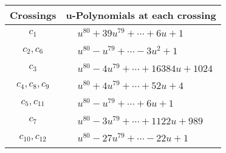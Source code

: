 \documentclass[1p]{elsarticle_modified}
\theoremstyle{definition}
\begin{document}
\begin{tabular}{m{50pt}|m{274pt}}
Crossings & \hspace{64pt}u-Polynomials at each crossing \\
\hline $$\begin{aligned}c_{1}\end{aligned}$$&$\begin{aligned}
&u^{80}+39 u^{79}+\cdots+6 u+1
\end{aligned}$\\
\hline $$\begin{aligned}c_{2},c_{6}\end{aligned}$$&$\begin{aligned}
&u^{80}- u^{79}+\cdots-3 u^2+1
\end{aligned}$\\
\hline $$\begin{aligned}c_{3}\end{aligned}$$&$\begin{aligned}
&u^{80}-4 u^{79}+\cdots+16384 u+1024
\end{aligned}$\\
\hline $$\begin{aligned}c_{4},c_{8},c_{9}\end{aligned}$$&$\begin{aligned}
&u^{80}+4 u^{79}+\cdots+52 u+4
\end{aligned}$\\
\hline $$\begin{aligned}c_{5},c_{11}\end{aligned}$$&$\begin{aligned}
&u^{80}- u^{79}+\cdots+6 u+1
\end{aligned}$\\
\hline $$\begin{aligned}c_{7}\end{aligned}$$&$\begin{aligned}
&u^{80}-3 u^{79}+\cdots+1122 u+989
\end{aligned}$\\
\hline $$\begin{aligned}c_{10},c_{12}\end{aligned}$$&$\begin{aligned}
&u^{80}-27 u^{79}+\cdots-22 u+1
\end{aligned}$\\
\hline
\end{tabular}\\~\\
\newpage\renewcommand{\arraystretch}{1}
\end{document}
